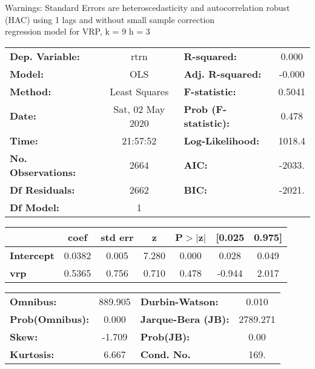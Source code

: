 Warnings: \newline
 [1] Standard Errors are heteroscedasticity and autocorrelation robust (HAC) using 1 lags and without small sample correction\\ 

regression model for VRP, k = 9 h = 3\begin{center}
\begin{tabular}{lclc}
\toprule
\textbf{Dep. Variable:}    &       rtrn       & \textbf{  R-squared:         } &     0.000   \\
\textbf{Model:}            &       OLS        & \textbf{  Adj. R-squared:    } &    -0.000   \\
\textbf{Method:}           &  Least Squares   & \textbf{  F-statistic:       } &    0.5041   \\
\textbf{Date:}             & Sat, 02 May 2020 & \textbf{  Prob (F-statistic):} &    0.478    \\
\textbf{Time:}             &     21:57:52     & \textbf{  Log-Likelihood:    } &    1018.4   \\
\textbf{No. Observations:} &        2664      & \textbf{  AIC:               } &    -2033.   \\
\textbf{Df Residuals:}     &        2662      & \textbf{  BIC:               } &    -2021.   \\
\textbf{Df Model:}         &           1      & \textbf{                     } &             \\
\bottomrule
\end{tabular}
\begin{tabular}{lcccccc}
                   & \textbf{coef} & \textbf{std err} & \textbf{z} & \textbf{P$> |$z$|$} & \textbf{[0.025} & \textbf{0.975]}  \\
\midrule
\textbf{Intercept} &       0.0382  &        0.005     &     7.280  &         0.000        &        0.028    &        0.049     \\
\textbf{vrp}       &       0.5365  &        0.756     &     0.710  &         0.478        &       -0.944    &        2.017     \\
\bottomrule
\end{tabular}
\begin{tabular}{lclc}
\textbf{Omnibus:}       & 889.905 & \textbf{  Durbin-Watson:     } &    0.010  \\
\textbf{Prob(Omnibus):} &   0.000 & \textbf{  Jarque-Bera (JB):  } & 2789.271  \\
\textbf{Skew:}          &  -1.709 & \textbf{  Prob(JB):          } &     0.00  \\
\textbf{Kurtosis:}      &   6.667 & \textbf{  Cond. No.          } &     169.  \\
\bottomrule
\end{tabular}
\end{center}

